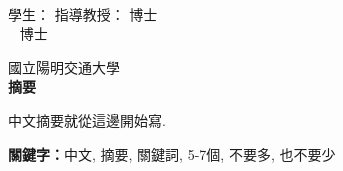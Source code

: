 \begin{center}
    \large
    \begin{singlespace}    
        \textbf{\chineseTitle{}} \\[0.5cm]
    \end{singlespace}

    \begin{singlespace}    
    學生：\studentCnName  \hspace{2.5cm}  指導教授：\advisorCnName \hspace{0.1cm} 博士 \\

    \ifdefined\advisorCnNameB %
        \hspace{9.6cm}  \advisorCnNameB ~ 博士 \\
    \fi
    \end{singlespace}

    \vspace{0.5cm}

    國立陽明交通大學\ \NameofDepartmentInstituteCN\ \iftoggle{iamphd}{博士班}{碩士班} \\[0.5cm]
    \textbf{摘\hspace{1cm}要} \\[0.5cm]

\end{center}

\normalsize 

中文摘要就從這邊開始寫.

\vspace{1cm}

\textbf{關鍵字：}中文, 摘要, 關鍵詞, 5-7個, 不要多, 也不要少
